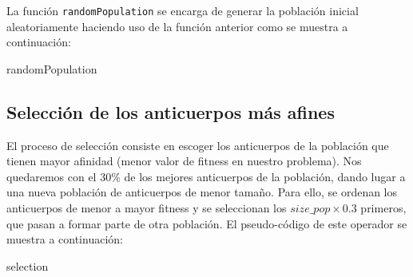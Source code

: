 \documentclass[10pt,a4paper]{article}
\begin{document}
La función \lstinline|randomPopulation| se encarga de generar la población inicial aleatoriamente haciendo uso de la función anterior como se muestra a continuación:

	\begin{algorithm}[H]
	\caption{\sc randomPopulation}
	\Begin{
		\For{i \textbf{in} $[0,size\_pop)$}{
			sol $\leftarrow$ $\operatorname{randomSolution}()$\\
			pop.solutions $\leftarrow$ pop.solutions $\cup$ $ \{sol\} $
		}
		$ pop.best\_sol $ $\leftarrow$ -1\\
		$ pop.best\_fitness $ $\leftarrow \infty$ \\
		$\operatorname{evaluatePopulation}(pop,evaluations)$\\
		\Return pop
	}
\end{algorithm}

\subsection{Selección de los anticuerpos más afines}

El proceso de selección consiste en escoger los anticuerpos de la población que tienen mayor afinidad (menor valor de fitness en nuestro problema). Nos quedaremos con el $ 30\% $ de los mejores anticuerpos de la población, dando lugar a una nueva población de anticuerpos de menor tamaño. Para ello, se ordenan los anticuerpos de menor a mayor fitness y se seleccionan los $size\_pop\times0.3$ primeros, que pasan a formar parte de otra población. El pseudo-código de este operador se muestra a continuación: 

\begin{algorithm}[H]
	\DontPrintSemicolon
	\caption{{\sc selection} }
\end{algorithm}
\end{document}
